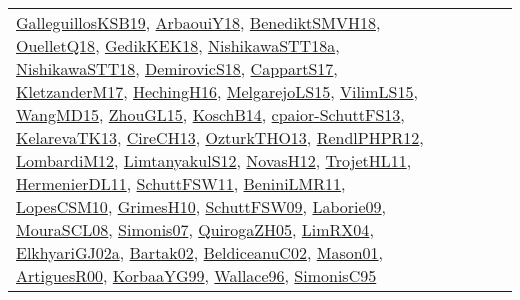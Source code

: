 {\begin{longtable}{lp{3cm}>{\raggedright}p{6cm}>{\raggedright}p{6cm}p{8cm}}
\href{papers/GalleguillosKSB19.pdf}{GalleguillosKSB19}\cite{GalleguillosKSB19}, \href{papers/ArbaouiY18.pdf}{ArbaouiY18}\cite{ArbaouiY18}, \href{papers/BenediktSMVH18.pdf}{BenediktSMVH18}\cite{BenediktSMVH18}, \href{papers/OuelletQ18.pdf}{OuelletQ18}\cite{OuelletQ18}, \href{articles/GedikKEK18.pdf}{GedikKEK18}\cite{GedikKEK18}, \href{papers/NishikawaSTT18a.pdf}{NishikawaSTT18a}\cite{NishikawaSTT18a}, \href{papers/NishikawaSTT18.pdf}{NishikawaSTT18}\cite{NishikawaSTT18}, \href{papers/DemirovicS18.pdf}{DemirovicS18}\cite{DemirovicS18}, \href{papers/CappartS17.pdf}{CappartS17}\cite{CappartS17}, \href{papers/KletzanderM17.pdf}{KletzanderM17}\cite{KletzanderM17}, \href{papers/HechingH16.pdf}{HechingH16}\cite{HechingH16}, \href{papers/MelgarejoLS15.pdf}{MelgarejoLS15}\cite{MelgarejoLS15}, \href{papers/VilimLS15.pdf}{VilimLS15}\cite{VilimLS15}, \href{articles/WangMD15.pdf}{WangMD15}\cite{WangMD15}, \href{papers/ZhouGL15.pdf}{ZhouGL15}\cite{ZhouGL15}, \href{papers/KoschB14.pdf}{KoschB14}\cite{KoschB14}, \href{papers/cpaior-SchuttFS13.pdf}{cpaior-SchuttFS13}\cite{cpaior-SchuttFS13}, \href{papers/KelarevaTK13.pdf}{KelarevaTK13}\cite{KelarevaTK13}, \href{papers/CireCH13.pdf}{CireCH13}\cite{CireCH13}, \href{articles/OzturkTHO13.pdf}{OzturkTHO13}\cite{OzturkTHO13}, \href{papers/RendlPHPR12.pdf}{RendlPHPR12}\cite{RendlPHPR12}, \href{articles/LombardiM12.pdf}{LombardiM12}\cite{LombardiM12}, \href{articles/LimtanyakulS12.pdf}{LimtanyakulS12}\cite{LimtanyakulS12}, \href{articles/NovasH12.pdf}{NovasH12}\cite{NovasH12}, \href{articles/TrojetHL11.pdf}{TrojetHL11}\cite{TrojetHL11}, \href{papers/HermenierDL11.pdf}{HermenierDL11}\cite{HermenierDL11}, \href{articles/SchuttFSW11.pdf}{SchuttFSW11}\cite{SchuttFSW11}, \href{articles/BeniniLMR11.pdf}{BeniniLMR11}\cite{BeniniLMR11}, \href{articles/LopesCSM10.pdf}{LopesCSM10}\cite{LopesCSM10}, \href{papers/GrimesH10.pdf}{GrimesH10}\cite{GrimesH10}, \href{papers/SchuttFSW09.pdf}{SchuttFSW09}\cite{SchuttFSW09}, \href{papers/Laborie09.pdf}{Laborie09}\cite{Laborie09}, \href{papers/MouraSCL08.pdf}{MouraSCL08}\cite{MouraSCL08}, \href{articles/Simonis07.pdf}{Simonis07}\cite{Simonis07}, \href{papers/QuirogaZH05.pdf}{QuirogaZH05}\cite{QuirogaZH05}, \href{papers/LimRX04.pdf}{LimRX04}\cite{LimRX04}, \href{papers/ElkhyariGJ02a.pdf}{ElkhyariGJ02a}\cite{ElkhyariGJ02a}, \href{papers/Bartak02.pdf}{Bartak02}\cite{Bartak02}, \href{papers/BeldiceanuC02.pdf}{BeldiceanuC02}\cite{BeldiceanuC02}, \href{articles/Mason01.pdf}{Mason01}\cite{Mason01}, \href{articles/ArtiguesR00.pdf}{ArtiguesR00}\cite{ArtiguesR00}, \href{papers/KorbaaYG99.pdf}{KorbaaYG99}\cite{KorbaaYG99}, \href{articles/Wallace96.pdf}{Wallace96}\cite{Wallace96}, \href{papers/SimonisC95.pdf}{SimonisC95}\cite{SimonisC95}\\

\end{longtable}}
